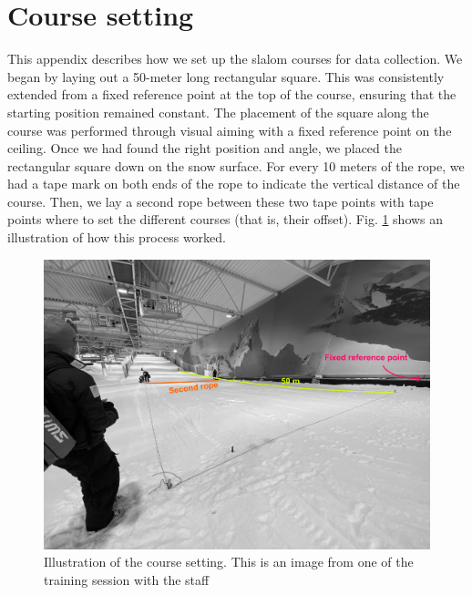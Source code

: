 \documentclass{article}
\begin{document}


\appendix

\section{Course setting}\label{appendixa}
This appendix describes how we set up the slalom courses for data collection. We began by laying out a 50-meter long rectangular square. This was consistently extended from a fixed reference point at the top of the course, ensuring that the starting position remained constant. The placement of the square along the course was performed through visual aiming with a fixed reference point on the ceiling. Once we had found the right position and angle, we placed the rectangular square down on the snow surface. For every 10 meters of the rope, we had a tape mark on both ends of the rope to indicate the vertical distance of the course. Then, we lay a second rope between these two tape points with tape points where to set the different courses (that is, their offset). Fig. \ref{fig: coursesetting} shows an illustration of how this process worked.




\begin{figure}[H]
\centering
\includegraphics{figurer/figure_appendix_course.jpg}
\caption{Illustration of the course setting. This is an image from one of the training session with the staff}\label{fig: coursesetting}
\end{figure}
\end{document}
